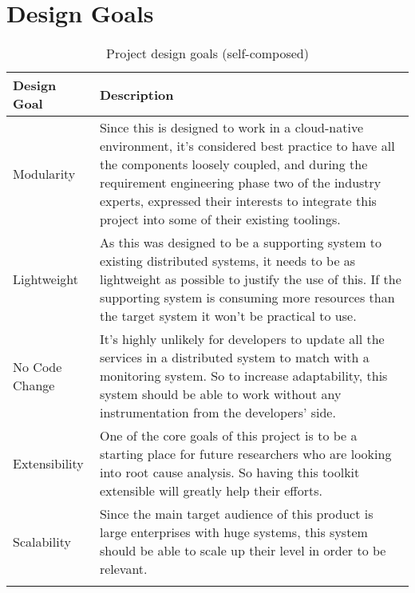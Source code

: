 \section{Design Goals}
\begin{longtable}{|p{22mm}|p{131mm}|}
\hline
\textbf{Design Goal} &
    \textbf{Description} \\ \hline
    Modularity &
    Since this is designed to work in a cloud-native environment, it’s considered best practice to have all the components loosely coupled, and during the requirement engineering phase two of the industry experts, expressed their interests to integrate this project into some of their existing toolings. \\ \hline
    
    Lightweight &
    As this was designed to be a supporting system to existing distributed systems, it needs to be as lightweight as possible to justify the use of this. If the supporting system is consuming more resources than the target system it won’t be practical to use. \\ \hline
    
    No Code Change &
    It’s highly unlikely for developers to update all the services in a distributed system to match with a monitoring system. So to increase adaptability, this system should be able to work without any instrumentation from the developers’ side. \\ \hline
    
    Extensibility &
    One of the core goals of this project is to be a starting place for future researchers who are looking into root cause analysis. So having this toolkit extensible will greatly help their efforts. \\ \hline
    
    Scalability &
    Since the main target audience of this product is large enterprises with huge systems, this system should be able to scale up their level in order to be relevant. \\ \hline

    \caption{Project design goals (self-composed)}
\end{longtable}